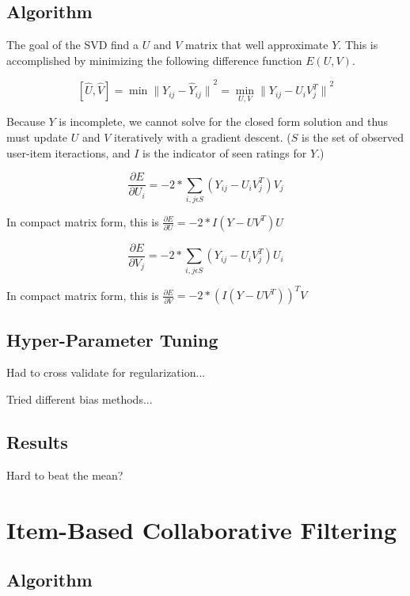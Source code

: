 \documentclass[12pt]{article}
\begin{document}
\subsection{Algorithm}
The goal of the SVD find a $U$ and $V$ matrix that well approximate $Y$. This is accomplished by minimizing the following difference function $E(U,V)$.

$$ [\hat{U}, \hat{V}] = \min{\|Y_{ij} - \hat{Y}_{ij}\|}^2 = \min\limits_{U,V}{\|Y_{ij} - U_i V_j^T\|}^2$$

Because $Y$ is incomplete, we cannot solve for the closed form solution and thus must update $U$ and $V$ iteratively with a gradient descent. ($S$ is the set of observed user-item iteractions, and $I$ is the indicator of seen ratings for $Y$.)

$$ \frac{\partial E}{\partial U_i} = -2 * \sum\limits_{i,j \epsilon S} (Y_{ij} - U_i V_j^T) V_j $$

\begin{center}
  In compact matrix form, this is $\frac{\partial E}{\partial U} = -2 * I (Y - U V^T)U $
\end{center}

$$ \frac{\partial E}{\partial V_j} = -2 * \sum\limits_{i,j \epsilon S} (Y_{ij} - U_i V_j^T) U_i $$

\begin{center}
  In compact matrix form, this is $\frac{\partial E}{\partial V} = -2 * (I (Y - U V^T))^T V $
\end{center}

\subsection{Hyper-Parameter Tuning}
Had to cross validate for regularization...

Tried different bias methods...

\subsection{Results}

Hard to beat the mean?

\section{Item-Based Collaborative Filtering}

\subsection{Algorithm}
\end{document}
